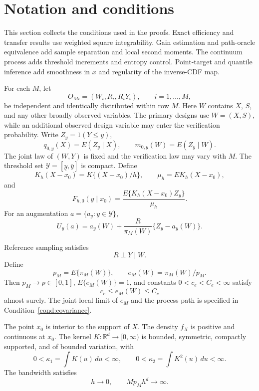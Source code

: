 \section{Notation and conditions}
\label{sec:supp-assumptions}

This section collects the conditions used in the proofs. Exact efficiency and transfer results use weighted square integrability. Gain estimation and path-oracle equivalence add sample separation and local second moments. The continuum process adds threshold increments and entropy control. Point-target and quantile inference add smoothness in \(x\) and regularity of the inverse-CDF map.

For each \(M\), let
\[
O_{Mi}=(W_i,R_i,R_iY_i),\qquad i=1,\ldots,M,
\]
be independent and identically distributed within row \(M\). Here \(W\)
contains \(X\), \(S\), and any other broadly observed variables. The primary
designs use \(W=(X,S)\), while an additional observed design variable may
enter the verification probability. Write \(Z_y=1(Y\le y)\),
\[
q_{0,y}(X)=E(Z_y\mid X),
\qquad
m_{0,y}(W)=E(Z_y\mid W).
\]
The joint law of \((W,Y)\) is fixed and the verification law may vary with
\(M\). The threshold set \(\mathcal Y=[\underline y,\overline y]\) is compact. Define
\[
K_h(X-x_0)=K\{(X-x_0)/h\},
\qquad
\mu_h=E K_h(X-x_0),
\]
and
\[
F_{h,0}(y\mid x_0)
=
\frac{E\{K_h(X-x_0)Z_y\}}{\mu_h}.
\]
For an augmentation \(a=\{a_y:y\in\mathcal Y\}\),
\[
U_y(a)=a_y(W)+\frac{R}{\pi_M(W)}\{Z_y-a_y(W)\}.
\]

\begin{assumption}
\label{cond:sampling}
Reference sampling satisfies
\[
R\perp Y\mid W.
\]
Define
\[
p_M=E\{\pi_M(W)\},
\qquad
e_M(W)=\pi_M(W)/p_M.
\]
Then \(p_M\to p\in[0,1]\), \(E\{e_M(W)\}=1\), and constants \(0<c_e<C_e<\infty\) satisfy
\[
c_e\le e_M(W)\le C_e
\]
almost surely. The joint local limit of \(e_M\) and the process path is specified in Condition~\ref{cond:covariance}.
\end{assumption}

\begin{assumption}
\label{cond:kernel}
The point \(x_0\) is interior to the support of \(X\). The density \(f_X\) is positive and continuous at \(x_0\). The kernel \(K:\mathbb R^d\to[0,\infty)\) is bounded, symmetric, compactly supported, and of bounded variation, with
\[
0<\kappa_1=\int K(u)\,du<\infty,
\qquad
0<\kappa_2=\int K^2(u)\,du<\infty.
\]
The bandwidth satisfies
\[
h\to0,
\qquad
Mp_Mh^d\to\infty.
\]
\end{assumption}

